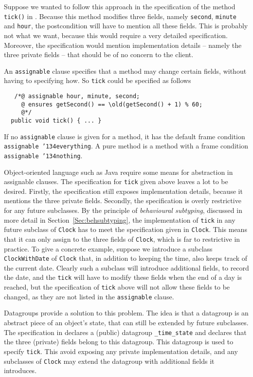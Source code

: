 \documentclass{llncs}
\def\old{\texttt{\char'134old}}
\def\everything{\texttt{\char'134everything}}
\def\nothing{\texttt{\char'134nothing}}
\begin{document}
Suppose we wanted to follow this approach in the specification 
of the method \texttt{tick()} in .
Because this method modifies three fields, namely
\texttt{second}, \texttt{minute} and \texttt{hour}, 
the postcondition will have to mention all these fields.
This is probably not what we want, because this would require a very
detailed specification. Moreover, the specification would mention implementation 
details -- namely the three private fields -- that should be of no concern to the 
client.

An  \texttt{assignable} clause specifies that a method may change certain 
fields, without having to specifying how.
So \texttt{tick} could be specified as follows
\begin{verbatim}
   /*@ assignable hour, minute, second;
     @ ensures getSecond() == \old(getSecond() + 1) % 60;
     @*/
  public void tick() { ... }
\end{verbatim}
If no \texttt{assignable} clause is given for a method, it has the
default frame condition \texttt{assignable \everything}.
A pure method is a method with a frame condition \texttt{assignable \nothing}.

Object-oriented language such as Java require some means for abstraction in 
assignable clauses.
The specification for \texttt{tick} given above leaves a lot to be desired.
Firstly, the specification still exposes implementation details,
because it mentions the three private fields.
Secondly, the specification is overly restrictive for any future subclasses.
By the principle of \emph{behavioural subtyping}, discussed in more detail
in Section~\ref{Sec:behsubtyping}, the implementation of \texttt{tick} in any future
subclass of \texttt{Clock} has to meet the specification given in \texttt{Clock}.
This means that it can only assign to the three fields of \texttt{Clock},
which is far to restrictive in practice.
To give a concrete example, suppose we introduce a subclass \texttt{ClockWithDate} 
of \texttt{Clock} that, in addition to keeping the time, also keeps track of the 
current date.  Clearly such a subclass will introduce additional fields, to record 
the date, and the \texttt{tick} will have to modify these fields when the end
of a day is reached,  but the specification of \texttt{tick} above will not allow 
these fields to be changed, as they are not listed in the \texttt{assignable} clause.

Datagroups \cite{Leino98} provide a solution to 
this problem. The idea is that a datagroup is an abstract piece of an object's
state, that can still be extended by future subclasses.
The specification in  declares a (public) datagroup
\texttt{\_time\_state} and declares that the three (private) fields belong
to this datagroup. This datagroup is used to specify \texttt{tick}.
This avoid exposing any private implementation details, and
any subclasses of \texttt{Clock} may extend the datagroup with
additional fields it introduces.
\end{document}
